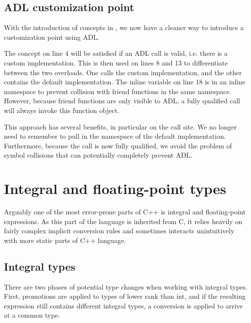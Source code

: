 \subsection{\texorpdfstring{ ADL customization point}{C++20 ADL customization point}}

With the introduction of concepts in , we now have a cleaner way to introduce a customization point using ADL.

\begin{codebox}[]{\href{https://compiler-explorer.com/z/Kr13she7v}{\ExternalLink}}
\footnotesize The concept on line 4 will be satisfied if an ADL call is valid, i.e. there is a custom implementation. This is then used on lines 8 and 13 to differentiate between the two overloads. One calls the custom implementation, and the other contains the default implementation. The inline variable on line 18 is in an inline namespace to prevent collision with friend functions in the same namespace. However, because friend functions are only visible to ADL, a fully qualified call will always invoke this function object.
\tcblower
{}
\end{codebox}

This approach has several benefits, in particular on the call site. We no longer need to remember to pull in the namespace of the default implementation. Furthermore, because the call is now fully qualified, we avoid the problem of symbol collisions that can potentially completely prevent ADL.

\section{Integral and floating-point types}
\label{theory:numerics}

Arguably one of the most error-prone parts of C++ is integral and floating-point expressions. As this part of the language is inherited from C, it relies heavily on fairly complex implicit conversion rules and sometimes interacts unintuitively with more static parts of C++ language.

\subsection{Integral types}

There are two phases of potential type changes when working with integral types. First, promotions are applied to types of lower rank than int, and if the resulting expression still contains different integral types, a conversion is applied to arrive at a common type.

